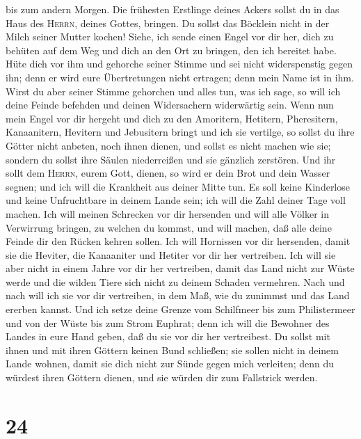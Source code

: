 bis zum andern Morgen.  Die frühesten Erstlinge deines
Ackers sollst du in das Haus des \textsc{Herrn}, deines Gottes, bringen.
Du sollst das Böcklein nicht in der Milch seiner Mutter kochen!
 Siehe, ich sende einen Engel vor dir her, dich zu
behüten auf dem Weg und dich an den Ort zu bringen, den ich bereitet
habe.  Hüte dich vor ihm und gehorche seiner Stimme und
sei nicht widerspenstig gegen ihn; denn er wird eure Übertretungen nicht
ertragen; denn mein Name ist in ihm.  Wirst du aber
seiner Stimme gehorchen und alles tun, was ich sage, so will ich deine
Feinde befehden und deinen Widersachern widerwärtig sein.
 Wenn nun mein Engel vor dir hergeht und dich zu den
Amoritern, Hetitern, Pheresitern, Kanaanitern, Hevitern und Jebusitern
bringt und ich sie vertilge,  so sollst du ihre Götter
nicht anbeten, noch ihnen dienen, und sollst es nicht machen wie sie;
sondern du sollst ihre Säulen niederreißen und sie gänzlich zerstören.
 Und ihr sollt dem \textsc{Herrn}, eurem Gott, dienen, so
wird er dein Brot und dein Wasser segnen; und ich will die Krankheit aus
deiner Mitte tun.  Es soll keine Kinderlose und keine
Unfruchtbare in deinem Lande sein; ich will die Zahl deiner Tage voll
machen.  Ich will meinen Schrecken vor dir hersenden und
will alle Völker in Verwirrung bringen, zu welchen du kommst, und will
machen, daß alle deine Feinde dir den Rücken kehren sollen.
 Ich will Hornissen vor dir hersenden, damit sie die
Heviter, die Kanaaniter und Hetiter vor dir her vertreiben.
 Ich will sie aber nicht in einem Jahre vor dir her
vertreiben, damit das Land nicht zur Wüste werde und die wilden Tiere
sich nicht zu deinem Schaden vermehren.  Nach und nach
will ich sie vor dir vertreiben, in dem Maß, wie du zunimmst und das
Land ererben kannst.  Und ich setze deine Grenze vom
Schilfmeer bis zum Philistermeer und von der Wüste bis zum Strom
Euphrat; denn ich will die Bewohner des Landes in eure Hand geben, daß
du sie vor dir her vertreibest.  Du sollst mit ihnen und
mit ihren Göttern keinen Bund schließen;  sie sollen
nicht in deinem Lande wohnen, damit sie dich nicht zur Sünde gegen mich
verleiten; denn du würdest ihren Göttern dienen, und sie würden dir zum
Fallstrick werden.

\hypertarget{section-23}{%
\section{24}\label{section-23}}

